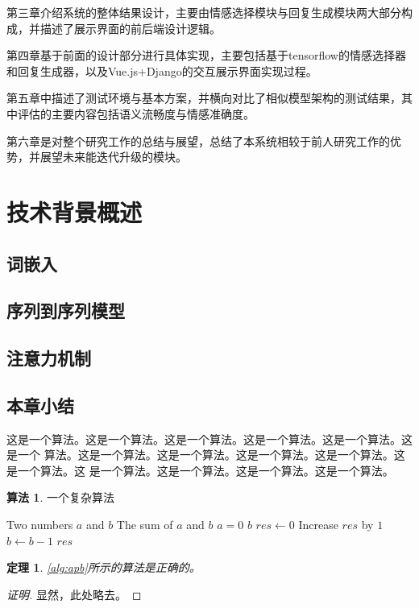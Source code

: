 \documentclass[supercite]{HustGraduPaper}
\newcommand{\ralg}[1]{\autoref{alg:#1}}
\newtheorem{thm}{定理}[section]
\theoremstyle{definition}
\newtheorem{alg}{算法}[section]
\begin{document}
第三章介绍系统的整体结果设计，主要由情感选择模块与回复生成模块两大部分构成，并描述了展示界面的前后端设计逻辑。

第四章基于前面的设计部分进行具体实现，主要包括基于tensorflow的情感选择器和回复生成器，以及Vue.js+Django的交互展示界面实现过程。

第五章中描述了测试环境与基本方案，并横向对比了相似模型架构的测试结果，其中评估的主要内容包括语义流畅度与情感准确度。

第六章是对整个研究工作的总结与展望，总结了本系统相较于前人研究工作的优势，并展望未来能迭代升级的模块。


\section{技术背景概述} 
\subsection{词嵌入}
\subsection{序列到序列模型}
\subsection{注意力机制}
\subsection{本章小结}
这是一个算法。这是一个算法。这是一个算法。这是一个算法。这是一个算法。这是一个
算法。这是一个算法。这是一个算法。这是一个算法。这是一个算法。这是一个算法。这
是一个算法。这是一个算法。这是一个算法。这是一个算法。

\begin{shaded*}\begin{alg}{一个复杂算法}
  \label{alg:apb}
  \begin{algorithmic}
    \Input Two numbers $a$ and $b$
    \Output The sum of $a$ and $b$
      \If $a = 0$
        \State \Return $b$
      \EndIf
      \State $res \gets 0$
        \State Increase $res$ by $1$
        \State $b \gets b - 1$
      \EndWhile
      \State \Return $res$
    \EndProcedure
  \end{algorithmic}
\end{alg}\end{shaded*}

\begin{thm} \label{thm:gsb-apprx}
  \ralg{apb}所示的算法是正确的。
\end{thm}
\begin{proof}[证明]
  显然，此处略去。
\end{proof}
\end{document}
